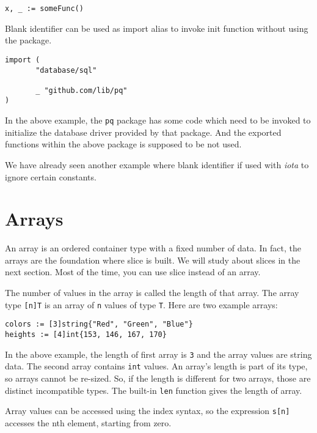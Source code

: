 \begin{lstlisting}[numbers=none]
x, _ := someFunc()
\end{lstlisting}

Blank identifier can be used as import alias to invoke init function
without using the package.

\begin{lstlisting}[numbers=none]
import (
       "database/sql"

       _ "github.com/lib/pq"
)
\end{lstlisting}

In the above example, the \texttt{pq} package has some code which need
to be invoked to initialize the database driver provided by that
package.  And the exported functions within the above package is
supposed to be not used.

We have already seen another example where blank identifier if used
with \textit{iota} to ignore certain constants.

\section{Arrays}
\label{sec:arrays}

An array is an ordered container type with a fixed number
of data.  In fact, the arrays are the foundation where slice is built.
We will study about slices in the next section.  Most of the time, you
can use slice instead of an array.

The number of values in the array is called the length of that array.
The array type \texttt{[n]T} is an array of \texttt{n} values of
type \texttt{T}.  Here are two example arrays:

\begin{lstlisting}[numbers=none]
colors := [3]string{"Red", "Green", "Blue"}
heights := [4]int{153, 146, 167, 170}
\end{lstlisting}

In the above example, the length of first array is \texttt{3} and the
array values are string data.  The second array contains \texttt{int}
values.  An array's length is part of its type, so arrays cannot be
re-sized.  So, if the length is different for two arrays, those are
distinct incompatible types. The built-in \texttt{len} function gives
the length of array.

Array values can be accessed using the index syntax, so the expression
\texttt{s[n]} accesses the nth element, starting from zero.

